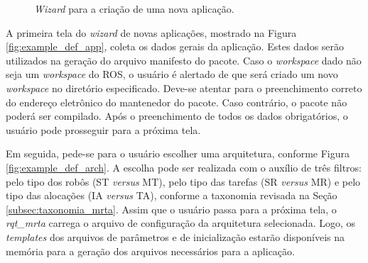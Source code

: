 \begin{figure}[htb]
                \caption{\textit{Wizard} para a criação de uma nova aplicação.} \label{fig:example_new_app}
            \end{figure}
            
            A primeira tela do \textit{wizard} de novas aplicações, mostrado na Figura \ref{fig:example_def_app}, coleta os dados gerais da aplicação. Estes dados serão utilizados na geração do arquivo manifesto do pacote. Caso o \textit{workspace} dado não seja um \textit{workspace} do ROS, o usuário é alertado de que será criado um novo \textit{workspace} no diretório especificado. Deve-se atentar para o preenchimento correto do endereço eletrônico do mantenedor do pacote. Caso contrário, o pacote não poderá ser compilado. Após o preenchimento de todos os dados obrigatórios, o usuário pode prosseguir para a próxima tela.
            
            Em seguida, pede-se para o usuário escolher uma arquitetura, conforme Figura \ref{fig:example_def_arch}. A escolha pode ser realizada com o auxílio de três filtros: pelo tipo dos robôs (ST \textit{versus} MT), pelo tipo das tarefas (SR \textit{versus} MR) e pelo tipo das alocações (IA \textit{versus} TA), conforme a taxonomia revisada na Seção \ref{subsec:taxonomia_mrta}. Assim que o usuário passa para a próxima tela, o \textit{rqt\_mrta} carrega o arquivo de configuração da arquitetura selecionada. Logo, os \textit{templates} dos arquivos de parâmetros e de inicialização estarão disponíveis na memória para a geração dos arquivos necessários para a aplicação.
            
